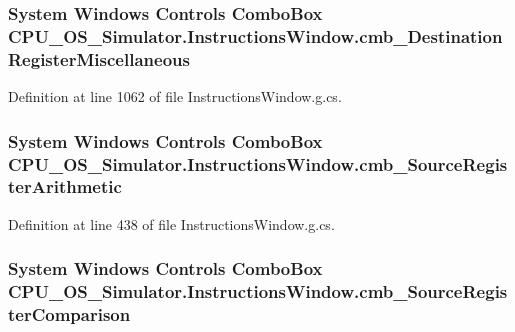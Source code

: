 \subsubsection[{cmb\+\_\+\+Destination\+Register\+Miscellaneous}]{\setlength{\rightskip}{0pt plus 5cm}System Windows Controls Combo\+Box C\+P\+U\+\_\+\+O\+S\+\_\+\+Simulator.\+Instructions\+Window.\+cmb\+\_\+\+Destination\+Register\+Miscellaneous\hspace{0.3cm}{\ttfamily [package]}}\label{class_c_p_u___o_s___simulator_1_1_instructions_window_ac4dab6ef32a46a295d6937b6bbda7813}


Definition at line 1062 of file Instructions\+Window.\+g.\+cs.

\hypertarget{class_c_p_u___o_s___simulator_1_1_instructions_window_aad493dd174601ec265d5ad261f33d525}{}
\subsubsection[{cmb\+\_\+\+Source\+Register\+Arithmetic}]{\setlength{\rightskip}{0pt plus 5cm}System Windows Controls Combo\+Box C\+P\+U\+\_\+\+O\+S\+\_\+\+Simulator.\+Instructions\+Window.\+cmb\+\_\+\+Source\+Register\+Arithmetic\hspace{0.3cm}{\ttfamily [package]}}\label{class_c_p_u___o_s___simulator_1_1_instructions_window_aad493dd174601ec265d5ad261f33d525}


Definition at line 438 of file Instructions\+Window.\+g.\+cs.

\hypertarget{class_c_p_u___o_s___simulator_1_1_instructions_window_af7acb32053b1cf27ee94bbf47efc9fbe}{}
\subsubsection[{cmb\+\_\+\+Source\+Register\+Comparison}]{\setlength{\rightskip}{0pt plus 5cm}System Windows Controls Combo\+Box C\+P\+U\+\_\+\+O\+S\+\_\+\+Simulator.\+Instructions\+Window.\+cmb\+\_\+\+Source\+Register\+Comparison\hspace{0.3cm}{\ttfamily [package]}}\label{class_c_p_u___o_s___simulator_1_1_instructions_window_af7acb32053b1cf27ee94bbf47efc9fbe}


